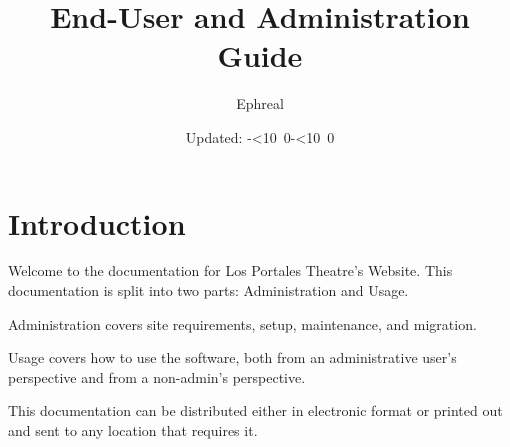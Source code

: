 \def\mytoday{\leavevmode\hbox{\the\year-\twodigits\month-\twodigits\day}}
\def\twodigits#1{\ifnum#1<10 0\fi\the#1}

\title{End-User and Administration Guide}
\author{Ephreal}
\date{Updated: \mytoday}
\maketitle
\clearpage
\tableofcontents

\clearpage

\section*{Introduction}
Welcome to the documentation for Los Portales Theatre's Website. This documentation is split into two parts: Administration and Usage.

Administration covers site requirements, setup, maintenance, and migration.

Usage covers how to use the software, both from an administrative user's perspective and from a non-admin's perspective.

This documentation can be distributed either in electronic format or printed out and sent to any location that requires it.
